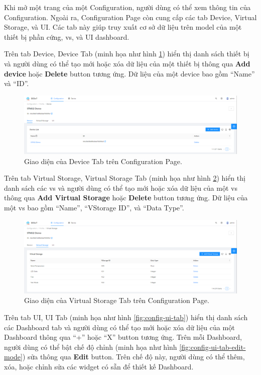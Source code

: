Khi mở một trang của một Configuration, người dùng có thể xem thông tin của Configuration. Ngoài ra, Configuration Page còn cung cấp các tab Device, Virtual Storage, và UI. Các tab này giúp truy xuất cơ sở dữ liệu trên model của một thiết bị phần cứng, \acrshort{vs}, và UI dashboard.

Trên tab Device, Device Tab (minh họa như hình \ref{fig:config-device-tab}) hiển thị danh sách thiết bị và người dùng có thể tạo mới hoặc xóa dữ liệu của một thiết bị thông qua \textbf{Add device} hoặc \textbf{Delete} button tương ứng. Dữ liệu của một device bao gồm ``Name'' và ``ID''.

\begin{figure}[htp]
\centering
\includegraphics[width=1.0\linewidth]{images/fig-config-device-tab.png}
\caption{Giao diện của Device Tab trên Configuration Page.}
\label{fig:config-device-tab}
\end{figure}

Trên tab Virtual Storage, Virtual Storage Tab (minh họa như hình \ref{fig:config-vstorage-tab}) hiển thị danh sách các \acrshort{vs} và người dùng có thể tạo mới hoặc xóa dữ liệu của một \acrshort{vs} thông qua \textbf{Add Virtual Storage} hoặc \textbf{Delete} button tương ứng. Dữ liệu của một \acrshort{vs} bao gồm ``Name'', ``VStorage ID'', và ``Data Type''.

\begin{figure}[htp]
\centering
\includegraphics[width=1.0\linewidth]{images/fig-config-vstorage-tab.png}
\caption{Giao diện của Virtual Storage Tab trên Configuration Page.}
\label{fig:config-vstorage-tab}
\end{figure}

Trên tab UI, UI Tab (minh họa như hình \ref{fig:config-ui-tab}) hiển thị danh sách các Dashboard tab và người dùng có thể tạo mới hoặc xóa dữ liệu của một Dashboard thông qua ``+'' hoặc ``X'' button tương ứng. Trên mỗi Dashboard, người dùng có thể bật chế độ chỉnh (minh họa như hình \ref{fig:config-ui-tab-edit-mode}) sửa thông qua \textbf{Edit} button. Trên chế độ này, người dùng có thể thêm, xóa, hoặc chỉnh sửa các widget có sẵn để thiết kế Dashboard.

